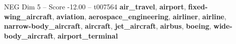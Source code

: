 \begin{textsample}{NEG Dim 5 – Score -12.00 – t007564}  \label{ex:f5_neg_035}
\textbf{air\_travel}, \textbf{airport}, \textbf{fixed-wing\_aircraft}, \textbf{aviation}, \textbf{aerospace\_engineering}, \textbf{airliner}, \textbf{airline}, \textbf{narrow-body\_aircraft}, \textbf{aircraft}, \textbf{jet\_aircraft}, \textbf{airbus}, \textbf{boeing}, \textbf{wide-body\_aircraft}, \textbf{airport\_terminal}

\end{textsample}
